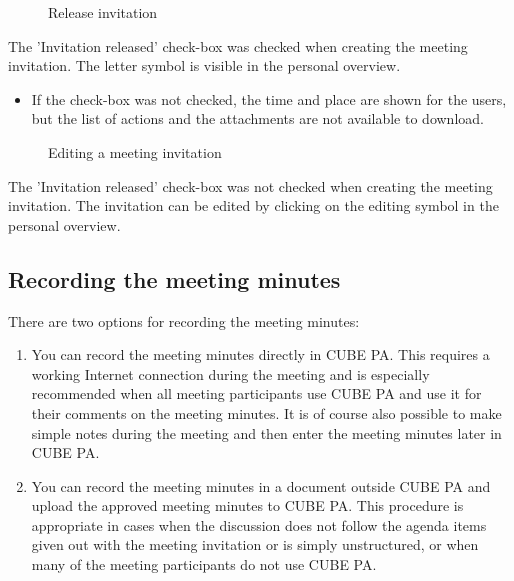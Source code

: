 \begin{figure}[H]
\caption{Release invitation}
\end{figure}

\begin{small}
The 'Invitation released' check-box was checked when creating the meeting invitation. The letter symbol is visible in the personal overview.
\end{small}

\begin{itemize}
\item
If the check-box was not checked, the time and place are shown for the users, but the list of actions and the attachments are not available to download.
\end{itemize}

\begin{figure}[H]
\caption{Editing a meeting invitation}
\end{figure}

\begin{small}
The 'Invitation released' check-box was not checked when creating the meeting invitation. The invitation can be edited by clicking on the editing symbol in the personal overview.
\end{small}


\subsection{Recording the meeting minutes}

There are two options for recording the meeting minutes:

\begin{enumerate}
\item
You can record the meeting minutes directly in CUBE PA. This requires a working Internet connection during the meeting and is especially recommended when all meeting participants use CUBE PA and use it for their comments on the meeting minutes. 
It is of course also possible to make simple notes during the meeting and then enter the meeting minutes later in CUBE PA.
\item
You can record the meeting minutes in a document outside CUBE PA and upload the approved meeting minutes to CUBE PA. 
This procedure is appropriate in cases when the discussion does not follow the agenda items given out with the meeting invitation or is simply unstructured, or when many of the meeting participants do not use CUBE PA.
\end{enumerate}

